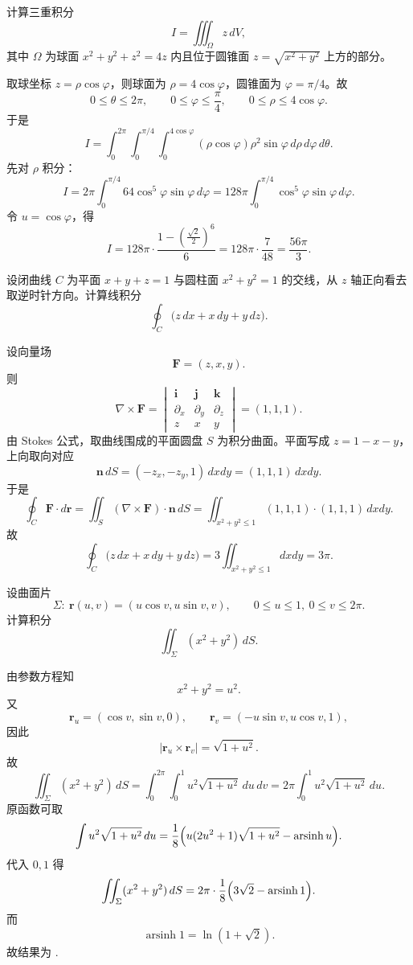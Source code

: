 ﻿


\begin{question}
计算三重积分
\[
I=\iiint_{\Omega} z\,dV,
\]
其中 $\Omega$ 为球面 $x^2+y^2+z^2=4z$ 内且位于圆锥面 $z=\sqrt{x^2+y^2}$ 上方的部分。
\begin{solution}

取球坐标 $z=\rho\cos\varphi$，则球面为 $\rho=4\cos\varphi$，圆锥面为 $\varphi=\pi/4$。故
\[
0\le \theta\le 2\pi,\qquad 0\le \varphi\le \frac\pi4,
\qquad 0\le \rho\le 4\cos\varphi.
\]
于是
\[
I=\int_0^{2\pi}\!\int_0^{\pi/4}\!\int_0^{4\cos\varphi}
(\rho\cos\varphi)\rho^2\sin\varphi\,d\rho\,d\varphi\,d\theta.
\]
先对 $\rho$ 积分：
\[
I=2\pi\int_0^{\pi/4}64\cos^5\varphi\sin\varphi\,d\varphi
=128\pi\int_0^{\pi/4}\cos^5\varphi\sin\varphi\,d\varphi.
\]
令 $u=\cos\varphi$，得
\[
I=128\pi\cdot \frac{1-(\frac{\sqrt2}{2})^6}{6}
=128\pi\cdot\frac{7}{48}=
\boxed{\frac{56\pi}{3}}.
\]
\end{solution}
\end{question}

\begin{question}
设闭曲线 $C$ 为平面 $x+y+z=1$ 与圆柱面 $x^2+y^2=1$ 的交线，从 $z$ 轴正向看去取逆时针方向。计算线积分
\[
\oint_C \bigl(z\,dx+x\,dy+y\,dz\bigr).
\]
\begin{solution}

设向量场
\[
\mathbf F=(z,x,y).
\]
则
\[
\nabla\times\mathbf F=
\begin{vmatrix}
\mathbf i&\mathbf j&\mathbf k\\
\partial_x&\partial_y&\partial_z\\
z&x&y
\end{vmatrix}=(1,1,1).
\]
由 Stokes 公式，取曲线围成的平面圆盘 $S$ 为积分曲面。平面写成 $z=1-x-y$，上向取向对应
\[
\mathbf n\,dS=(-z_x,-z_y,1)\,dxdy=(1,1,1)\,dxdy.
\]
于是
\[
\oint_C \mathbf F\cdot d\mathbf r
=\iint_S (\nabla\times\mathbf F)\cdot \mathbf n\,dS
=\iint_{x^2+y^2\le 1}(1,1,1)\cdot(1,1,1)\,dxdy.
\]
故
\[
\oint_C \bigl(z\,dx+x\,dy+y\,dz\bigr)=3\iint_{x^2+y^2\le 1}dxdy=\boxed{3\pi}.
\]
\end{solution}
\end{question}

\begin{question}
设曲面片
\[
\Sigma:\ \mathbf r(u,v)=(u\cos v,u\sin v,v),
\qquad 0\le u\le 1,\ 0\le v\le 2\pi.
\]
计算积分
\[
\iint_{\Sigma}(x^2+y^2)\,dS.
\]
\begin{solution}

由参数方程知
\[
x^2+y^2=u^2.
\]
又
\[
\mathbf r_u=(\cos v,\sin v,0),
\qquad
\mathbf r_v=(-u\sin v,u\cos v,1),
\]
因此
\[
|\mathbf r_u\times \mathbf r_v|=\sqrt{1+u^2}.
\]
故
\[
\iint_{\Sigma}(x^2+y^2)\,dS=
\int_0^{2\pi}\!\int_0^1 u^2\sqrt{1+u^2}\,du\,dv
=2\pi\int_0^1 u^2\sqrt{1+u^2}\,du.
\]
原函数可取
\[
\int u^2\sqrt{1+u^2}\,du
=\frac18\Bigl(u(2u^2+1)\sqrt{1+u^2}-\operatorname{arsinh}u\Bigr).
\]
代入 $0,1$ 得
\[
\iint_{\Sigma}(x^2+y^2)\,dS
=2\pi\cdot\frac18\Bigl(3\sqrt2-\operatorname{arsinh}1\Bigr).
\]
而
\[
\operatorname{arsinh}1=\ln(1+\sqrt2).
\]
故结果为
.
\end{solution}
\end{question}

